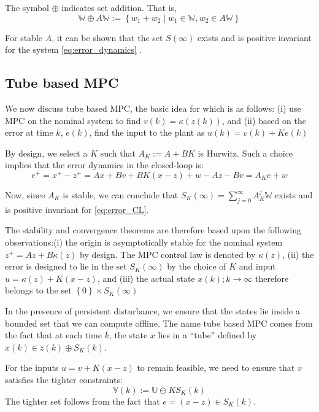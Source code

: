 \documentclass[10pt]{article}
\newcommand{\set}[1]{\left\lbrace #1 \right\rbrace}
\theoremstyle{definition}
\begin{document}
The symbol $\oplus$ indicates set addition. That is,
\[ \mathbb{W} \oplus A\mathbb{W} := \set{w_1+w_2 \mid w_1 \in
  \mathbb{W}, w_2 \in A\mathbb{W}}\]

For stable $A$, it can be shown that the set $S(\infty)$ exists and is
positive invariant for the system \eqref{eq:error_dynamics}
\citep{kolmanovsky:gilbert:1998}.


\subsection{Tube based MPC}

We now discuss tube based MPC, the basic idea for which is as follows: (i)
use MPC on the nominal system to find $v(k) = \kappa(z(k))$,  and (ii)
based on the error at time $k$, $e(k)$, find the input to the plant as $u(k) = v(k) + Ke(k)$

By design, we select a $K$ such that $A_K:=A+BK$ is Hurwitz. Such a choice
implies that the error dynamics in the closed-loop is:
\begin{equation}
\label{eq:error_CL}
e^+ = x^+-z^+=Ax+Bv+BK(x-z)+w-Az-Bv = A_Ke+w
\end{equation}

Now, since $A_K$ is stable, we can conclude that $S_K(\infty) =
\sum_{j=0}^{\infty}A_K^j\mathbb{W}$ exists and is positive invariant
for \eqref{eq:error_CL}.

The stability and convergence theorems are therefore based upon the
following observations:(i) the origin is asymptotically stable for the
nominal system $z^+= Az+B\kappa(z)$ by design. The MPC control law is
denoted by $\kappa(z)$, (ii) the error is designed to lie in the set
$S_K(\infty)$ by the   choice of $K$ and input $u = \kappa(z) +
K(x-z)$, and (iii) the actual state $x(k); k \rightarrow \infty$
therefore belongs to the set   $\set{0} \times S_K(\infty)$

In the presence of persistent disturbance, we ensure that the states
lie inside a bounded set that we can compute offline. The name tube
based MPC comes from the fact that at each time $k$, the state $x$
lies in a ``tube'' defined by $x(k) \in z(k)\oplus S_K(k)$. 

For the inputs $u = v+K(x-z)$ to remain feasible, we need to ensure
that $v$ satisfies the tighter constraints:
\begin{equation}
\mathbb{V}(k) := \mathbb{U} \ominus KS_K(k)
\end{equation}
The tighter set follows from the fact that $e = (x-z) \in
S_K(k)$. 
\end{document}
